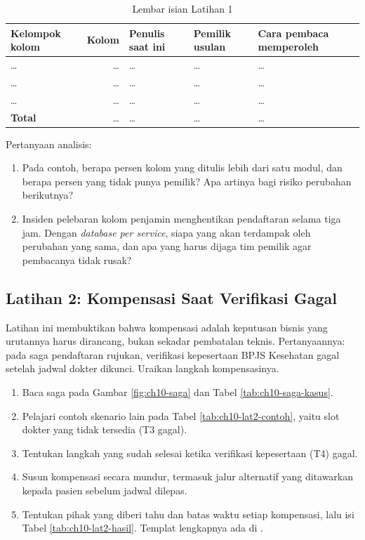 \begin{table}[!htb]
  \centering
  \caption{Lembar isian Latihan 1}
  \label{tab:ch10-lat1-hasil}
  \footnotesize
  \begin{tabularx}{\textwidth}{>{\raggedright\arraybackslash}p{2.1cm} r >{\raggedright\arraybackslash}p{2.5cm} >{\raggedright\arraybackslash}p{2.4cm} >{\raggedright\arraybackslash}X}
    \hline
    \textbf{Kelompok kolom} & \textbf{Kolom} & \textbf{Penulis saat ini} & \textbf{Pemilik usulan} &
      \textbf{Cara pembaca memperoleh} \\ \hline
    \dots & \dots & \dots & \dots & \dots \\ \hline
    \dots & \dots & \dots & \dots & \dots \\ \hline
    \dots & \dots & \dots & \dots & \dots \\ \hline
    \textbf{Total} & \dots & \dots & \dots & \dots \\ \hline
  \end{tabularx}
\end{table}

Pertanyaan analisis:
\begin{enumerate}
  \item Pada contoh, berapa persen kolom yang ditulis lebih dari satu modul, dan berapa persen yang
        tidak punya pemilik? Apa artinya bagi risiko perubahan berikutnya?
  \item Insiden pelebaran kolom penjamin menghentikan pendaftaran selama tiga jam. Dengan
        \textit{database per service}, siapa yang akan terdampak oleh perubahan yang sama, dan apa
        yang harus dijaga tim pemilik agar pembacanya tidak rusak?
\end{enumerate}

\subsection*{Latihan 2: Kompensasi Saat Verifikasi Gagal}

Latihan ini membuktikan bahwa kompensasi adalah keputusan bisnis yang urutannya harus dirancang,
bukan sekadar pembatalan teknis. Pertanyaannya: pada saga pendaftaran rujukan, verifikasi
kepesertaan BPJS Kesehatan gagal setelah jadwal dokter dikunci. Uraikan langkah kompensasinya.

\begin{enumerate}
  \item Baca saga pada Gambar \ref{fig:ch10-saga} dan Tabel \ref{tab:ch10-saga-kasus}.
  \item Pelajari contoh skenario lain pada Tabel \ref{tab:ch10-lat2-contoh}, yaitu slot dokter
        yang tidak tersedia (T3 gagal).
  \item Tentukan langkah yang sudah selesai ketika verifikasi kepesertaan (T4) gagal.
  \item Susun kompensasi secara mundur, termasuk jalur alternatif yang ditawarkan kepada pasien
        sebelum jadwal dilepas.
  \item Tentukan pihak yang diberi tahu dan batas waktu setiap kompensasi, lalu isi Tabel
        \ref{tab:ch10-lat2-hasil}. Templat lengkapnya ada di
        .
\end{enumerate}

